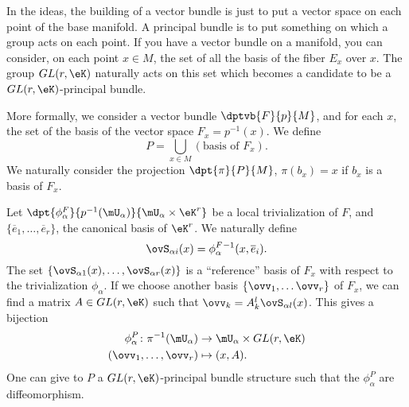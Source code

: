 In the ideas, the building of a vector bundle is just to put a vector space on each point of the base manifold. A principal bundle is to put something on which a group acts on each point. If you have a vector bundle on a manifold, you can consider, on each point $x\in M$, the set of all the basis of the fiber $E_x$ over $x$. The group $GL(r,\eK)$ naturally acts on this set which becomes a candidate to be a $GL(r,\eK)$-principal bundle.

More formally, we consider a vector bundle $\dptvb{F}{p}{M}$, and for each $x$, the set of the basis of the vector space $F_x=p^{-1}(x)$. We define
\[
  P=\bigcup_{x\in M}(\textrm{basis of $F_x$}).
\]
We naturally consider the projection $\dpt{\pi}{P}{M}$, $\pi(b_x)=x$ if $b_x$ is a basis of $F_x$.

Let $\dpt{\phi^F_{\alpha}}{p^{-1}(\mU_{\alpha})}{\mU_{\alpha}\times\eK^r}$ be a local trivialization of $F$, and $\{\overline{e}_1,\ldots,\overline{e}_r\}$, the canonical basis of $\eK^r$. We naturally define
\[
  \ovS_{\alpha i}(x)=\phi^F_{\alpha}{}^{-1}(x,\overline{e}_i).
\]
The set $\{\ovS_{\alpha 1}(x),\ldots,\ovS_{\alpha r}(x)\}$ is a ``reference''{} basis of $F_x$ with respect to the trivialization $\phi_{\alpha}$. If we choose another basis $\{\ovv_1,\ldots\ovv_r\}$ of $F_x$, we can find a matrix $A\in GL(r,\eK)$ such that $\ovv_k=A^l_k\ovS_{\alpha l}(x)$. This gives a bijection
\begin{equation}
	\begin{aligned}
		\phi_{\alpha}^P\colon \pi^{-1}(\mU_{\alpha})&\to \mU_{\alpha}\times GL(r,\eK) \\
		(\ovv_1,\ldots,\ovv_r)&\mapsto (x,A). 
	\end{aligned}
\end{equation}
One can give to $P$ a $GL(r,\eK)$-principal bundle structure such that the $\phi_{\alpha}^P$ are diffeomorphism.

